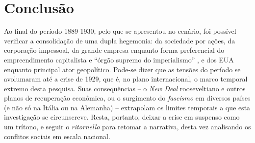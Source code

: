 \section{Conclusão}\label{sec:1.5}

Ao final do período 1889-1930, pelo que se apresentou no cenário, foi possível verificar a consolidação de uma dupla hegemonia: da sociedade por ações, da corporação impessoal, da grande empresa enquanto forma preferencial do empreendimento capitalista e ``órgão supremo do imperialismo'' \cite{PEDROSA1966a}, e dos EUA enquanto principal ator geopolítico. Pode-se dizer que as tensões do período se avolumaram até a crise de 1929, que é, no plano internacional, o marco temporal extremo desta pesquisa. Suas consequências -- o \textit{New Deal} rooseveltiano e outros planos de recuperação econômica, ou o surgimento do \textit{fascismo} em diversos países (e não só na Itália ou na Alemanha) -- extrapolam os limites temporais a que esta investigação se circunscreve. Resta, portanto, deixar a crise em suspenso como um trítono, e seguir o \textit{ritornello} para retomar a narrativa, desta vez analisando os conflitos sociais em escala nacional.